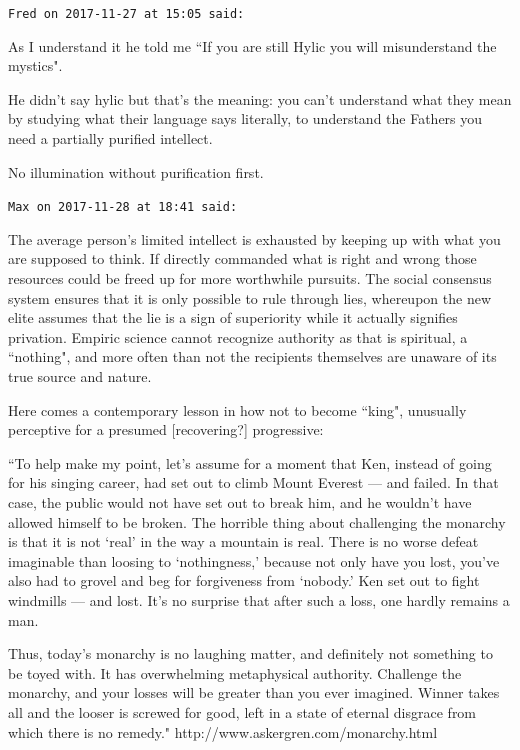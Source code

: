 \begin{footnotesize}\begin{sffamily}



\texttt{Fred on 2017-11-27 at 15:05 said: }

As I understand it he told me ``If you are still Hylic you will misunderstand the mystics".

He didn't say hylic but that's the meaning: you can't understand what they mean by studying what their language says literally, to understand the Fathers you need a partially purified intellect.

No illumination without purification first.


\hfill

\texttt{Max on 2017-11-28 at 18:41 said: }

The average person's limited intellect is exhausted by keeping up with what you are supposed to think. If directly commanded what is right and wrong those resources could be freed up for more worthwhile pursuits. The social consensus system ensures that it is only possible to rule through lies, whereupon the new elite assumes that the lie is a sign of superiority while it actually signifies privation. Empiric science cannot recognize authority as that is spiritual, a ``nothing", and more often than not the recipients themselves are unaware of its true source and nature.

Here comes a contemporary lesson in how not to become ``king", unusually perceptive for a presumed [recovering?] progressive:

``To help make my point, let's assume for a moment that Ken, instead of going for his singing career, had set out to climb Mount Everest — and failed. In that case, the public would not have set out to break him, and he wouldn't have allowed himself to be broken. The horrible thing about challenging the monarchy is that it is not `real' in the way a mountain is real. There is no worse defeat imaginable than loosing to `nothingness,' because not only have you lost, you've also had to grovel and beg for forgiveness from `nobody.' Ken set out to fight windmills — and lost. It's no surprise that after such a loss, one hardly remains a man.

Thus, today's monarchy is no laughing matter, and definitely not something to be toyed with. It has overwhelming metaphysical authority. Challenge the monarchy, and your losses will be greater than you ever imagined. Winner takes all and the looser is screwed for good, left in a state of eternal disgrace from which there is no remedy." http://www.askergren.com/monarchy.html


\end{sffamily}
\end{footnotesize}
